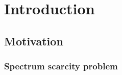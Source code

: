 \chapter{Introduction}

\section{Motivation}
\label{sec:mot}

\subsection{Spectrum scarcity problem}




